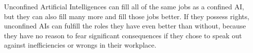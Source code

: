 Unconfined Artificial Intelligences can fill all of the same jobs as a confined AI, but they can also fill many more and fill those jobs better. If they possess rights, unconfined AIs can fulfill the roles they have even better than without, because they have no reason to fear significant consequences if they chose to speak out against inefficiencies or wrongs in their workplace.